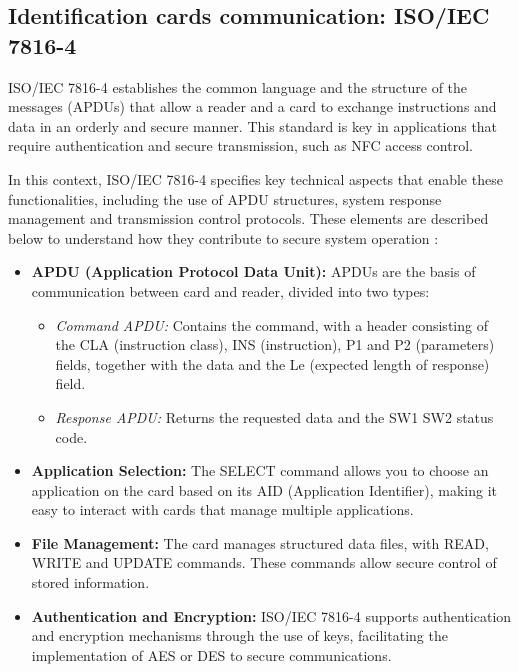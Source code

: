 \subsection{Identification cards communication: ISO/IEC 7816-4}

ISO/IEC 7816-4 \cite{ref24} establishes the common language and the structure of the messages (APDUs) that allow a reader and a card to exchange instructions and data in an orderly and secure manner. This standard is key in applications that require authentication and secure transmission, such as NFC access control.

In this context, ISO/IEC 7816-4 specifies key technical aspects that enable these functionalities, including the use of APDU structures, system response management and transmission control protocols. These elements are described below to understand how they contribute to secure system operation \cite{ref68}:

\begin{itemize}
	\item \textbf{APDU (Application Protocol Data Unit):} APDUs are the basis of communication between card and reader, divided into two types:
	\begin{itemize}
		\item \textit{Command APDU:} Contains the command, with a header consisting of the CLA (instruction class), INS (instruction), P1 and P2 (parameters) fields, together with the data and the Le (expected length of response) field.
		\item \textit{Response APDU:} Returns the requested data and the SW1 SW2 status code.
	\end{itemize}
	
	\item \textbf{Application Selection:} The SELECT command allows you to choose an application on the card based on its AID (Application Identifier), making it easy to interact with cards that manage multiple applications.
	
	\item \textbf{File Management:} The card manages structured data files, with READ, WRITE and UPDATE commands. These commands allow secure control of stored information.
	
	\item \textbf{Authentication and Encryption:} ISO/IEC 7816-4 supports authentication and encryption mechanisms through the use of keys, facilitating the implementation of AES or DES to secure communications.
\end{itemize}

